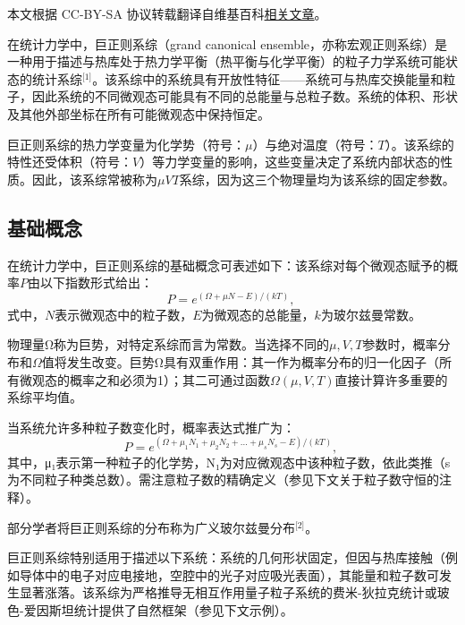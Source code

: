 
本文根据 CC-BY-SA 协议转载翻译自维基百科\href{https://en.wikipedia.org/wiki/Grand_canonical_ensemble}{相关文章}。

在统计力学中，巨正则系综（grand canonical ensemble，亦称宏观正则系综）是一种用于描述与热库处于热力学平衡（热平衡与化学平衡）的粒子力学系统可能状态的统计系综\(^\text{[1]}\)。该系综中的系统具有开放性特征——系统可与热库交换能量和粒子，因此系统的不同微观态可能具有不同的总能量与总粒子数。系统的体积、形状及其他外部坐标在所有可能微观态中保持恒定。

巨正则系综的热力学变量为化学势（符号：\(\mu\)）与绝对温度（符号：\(T\)）。该系综的特性还受体积（符号：\(V\)）等力学变量的影响，这些变量决定了系统内部状态的性质。因此，该系综常被称为\(\mu VT\)系综，因为这三个物理量均为该系综的固定参数。
\subsection{基础概念}
在统计力学中，巨正则系综的基础概念可表述如下：该系综对每个微观态赋予的概率\(P\)由以下指数形式给出：
\[
P = e^{(\Omega + \mu N - E)/(kT)},~
\]
式中，\(N\)表示微观态中的粒子数，\(E\)为微观态的总能量，\(k\)为玻尔兹曼常数。  

物理量Ω称为巨势，对特定系综而言为常数。当选择不同的\(\mu,V,T\)参数时，概率分布和\(\Omega\)值将发生改变。巨势Ω具有双重作用：其一作为概率分布的归一化因子（所有微观态的概率之和必须为1）；其二可通过函数\(\Omega(\mu,V,T)\)直接计算许多重要的系综平均值。  

当系统允许多种粒子数变化时，概率表达式推广为：  
\[
P = e^{(\Omega + \mu_1N_1 + \mu_2N_2 + \ldots + \mu_sN_s - E)/(kT)},~
\]  
其中，μ₁表示第一种粒子的化学势，N₁为对应微观态中该种粒子数，依此类推（s为不同粒子种类总数）。需注意粒子数的精确定义（参见下文关于粒子数守恒的注释）。  

部分学者将巨正则系综的分布称为广义玻尔兹曼分布\(^\text{[2]}\)。

巨正则系综特别适用于描述以下系统：系统的几何形状固定，但因与热库接触（例如导体中的电子对应电接地，空腔中的光子对应吸光表面），其能量和粒子数可发生显著涨落。该系综为严格推导无相互作用量子粒子系统的费米-狄拉克统计或玻色-爱因斯坦统计提供了自然框架（参见下文示例）。  
